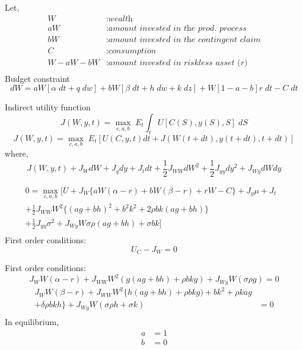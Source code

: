 \documentclass[
14pt,notheorems,hyperref={pdfauthor=whatever}
]{beamer}
\begin{document}
\begin{frame}
Let,
\begin{align*}
    W&: \textit{wealth}\\
    aW&: \textit{amount invested in the prod. process}\\
    bW&: \textit{amount invested in the contingent claim}\\
    C&: \textit{consumption}\\
    W-aW-bW&: \textit{amount invested in riskless asset (r)}\\
\end{align*}
Budget constraint
\begin{equation} \tag{5}
    dW = aW[\alpha\;dt+q\;dw]+bW[\beta\;dt+h\;dw+k\;dz]+W[1-a-b]r\;dt-C\;dt
\end{equation}
\end{frame}

\begin{frame}
Indirect utility function
\begin{equation} \tag{6}
    J(W,y,t) = \max_{c,a,b}\;E_t \int_t U[C(S),y(S),S]\;dS
\end{equation}
\[ J(W,y,t) = \max_{c,a,b}\;E_t [U(C,y,t)dt+J(W(t+dt),y(t+dt),t+dt)]\]
where,
\[ J(W,y,t)+J_W dW+J_y dy +J_t dt + \frac{1}{2} J_{WW} dW^2 + \frac{1}{2} J_{yy} dy^2 + J_{Wy} dW dy \]
\end{frame}

\begin{frame}
\begin{align*} \tag{7}
    0 = \max_{c,a,b} \bigg[ U+J_W \{aW(\alpha-r)+bW(\beta-r)+rW-C\} + J_y \mu + J_t&\\
    +\frac{1}{2} J_{WW} W^2 \{ (ag+bh)^2 + b^2k^2 +2\rho bk(ag+bh)\}&\\
    + \frac{1}{2} J_{yy}\sigma^2 + J_{Wy} W {\sigma \rho  (ag+bh) + \sigma b k} \bigg] &\\
\end{align*}
First order conditions:
\begin{equation} \tag{8}
    U_C-J_W=0
\end{equation}
\end{frame}

\begin{frame}
First order conditions:
\begin{equation} \tag{9}
    J_W W (\alpha-r) + J_{WW}W^2(g(ag+bh)+\rho bkg) + J_{Wy}W(\sigma\rho g) = 0
\end{equation}
\begin{align*} \tag{10}
    J_W W (\beta-r) + J_{WW}W^2\{h(ag+bh)+\rho bkg) + bk^2 + \rho kag&\\
     + \delta \rho bkh \} + J_{Wy}W(\sigma\rho h + \sigma k)& = 0\\
\end{align*}
In equilibrium,
\begin{align*}
    a &= 1\\
    b &= 0
\end{align*}
\end{frame}
\end{document}

